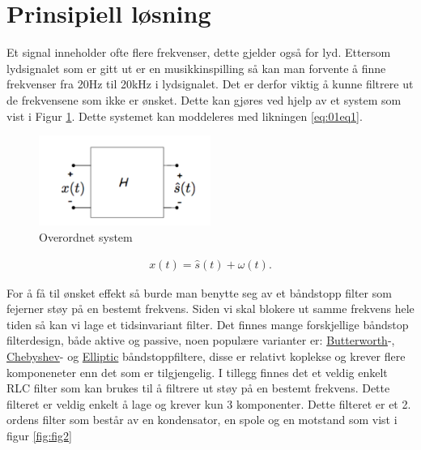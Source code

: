 \newpage
\section{Prinsipiell løsning}
\label{prinsipiellLoesning}


Et signal inneholder ofte flere frekvenser, dette gjelder også for lyd. Ettersom lydsignalet som er gitt ut er en musikkinspilling så kan man forvente å finne frekvenser fra 20Hz til 20kHz \cite{Frq_in_audio} i lydsignalet. Det er derfor viktig å kunne filtrere ut de frekvensene som ikke er ønsket. Dette kan gjøres ved hjelp av et system som vist i Figur \ref{fig:fig1}. Dette systemet kan moddeleres med likningen \ref{eq:01eq1}. \cite{Tek_notat}

\begin{figure}[!h]
	\centering
	\includegraphics[width=0.5\textwidth]{Bilder/Overordnetsystem.png}
	\caption{Overordnet system}
	\label{fig:fig1}
\end{figure}

\begin{equation}
	\label{eq:01eq1}
	\begin{split}
		x(t) = \hat{s}(t) + \omega(t).
	\end{split}
\end{equation}

For å få til ønsket effekt så burde man benytte seg av et båndstopp filter som fejerner støy på en bestemt frekvens. Siden vi skal blokere ut samme frekvens hele tiden så kan vi lage et tidsinvariant filter. Det finnes mange forskjellige båndstop filterdesign, både aktive og passive, noen populære varianter er: \href{https://www.falstad.com/afilter/circuitjs.html?cct=$+1+0.000005+5+50+5+50%0A%25+0+4540.3852025771785%0Ar+928+256+928+432+0+50%0A170+784+256+752+256+2+20+4000+5+0.1%0AO+928+256+992+256+0%0Aw+784+208+784+256+0%0Aw+864+208+864+256+0%0Ag+864+432+864+448+0%0Ag+928+432+928+448+0%0Ac+784+256+864+256+0+0.000004593296450259804+0%0Ac+864+352+864+432+0+1.7108344904994753e-7+0%0Al+784+208+864+208+0+0.0008554172452497378+0%0Al+864+256+864+352+0+0.022966482251299023+0%0AB+784+128+864+528+3+Box%0Aw+864+256+928+256+0%0A}{Butterworth}-, \href{https://en.wikipedia.org/wiki/Chebyshev_filter}{Chebyshev}- og \href{https://www.sciencedirect.com/topics/engineering/elliptic-filters}{Elliptic} båndstoppfiltere, disse er relativt koplekse og krever flere komponeneter enn det som er tilgjengelig. I tillegg finnes det et veldig enkelt RLC filter som kan brukes til å filtrere ut støy på en bestemt frekvens. Dette filteret er veldig enkelt å lage og krever kun 3 komponenter. Dette filteret er et 2. ordens filter som består av en kondensator, en spole og en motstand som vist i figur \ref{fig:fig2}

